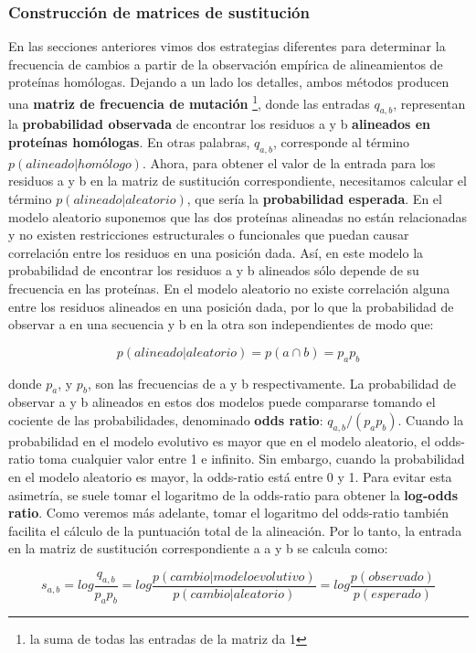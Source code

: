 \subsubsection{Construcción de matrices de sustitución}
En las secciones anteriores vimos dos estrategias diferentes para determinar la frecuencia de cambios a partir de la observación empírica de alineamientos de proteínas homólogas. Dejando a un lado los detalles, ambos métodos producen una \textbf{matriz de frecuencia de mutación} \footnote{la suma de todas las entradas de la matriz da 1}, donde las entradas $q_{a,b}$, representan la \textbf{probabilidad observada} de encontrar los residuos a y b \textbf{alineados en proteínas homólogas}. En otras palabras, $q_{a,b}$, corresponde al término $p(alineado|homólogo)$. Ahora, para obtener el valor de la entrada para los residuos a y b en la matriz de sustitución correspondiente, necesitamos calcular el término $p(alineado|aleatorio)$, que sería la \textbf{probabilidad esperada}. En el modelo aleatorio suponemos que las dos proteínas alineadas no están relacionadas y no existen restricciones estructurales o funcionales que puedan causar correlación entre los residuos en una posición dada. Así, en este modelo la probabilidad de encontrar los residuos a y b alineados sólo depende de su frecuencia en las proteínas. En el modelo aleatorio no existe correlación alguna entre los residuos alineados en una posición dada, por lo que la probabilidad de observar a en una secuencia y b en la otra son independientes de modo que:

$$p(alineado|aleatorio) = p(a \cap b) = p_a p_b $$

donde $p_a$, y $p_b$, son las frecuencias de a y b respectivamente. La probabilidad de observar a y b alineados en estos dos modelos puede compararse tomando el cociente de las probabilidades, denominado \textbf{odds ratio}: $q_{a,b}/(p_a p_b)$. Cuando la probabilidad en el modelo evolutivo es mayor que en el modelo aleatorio, el odds-ratio toma cualquier valor entre 1 e infinito. Sin embargo, cuando la probabilidad en el modelo aleatorio es mayor, la odds-ratio está entre 0 y 1. Para evitar esta asimetría, se suele tomar el logaritmo de la odds-ratio para obtener la \textbf{log-odds ratio}. Como veremos más adelante, tomar el logaritmo del odds-ratio también facilita el cálculo de la puntuación total de la alineación. Por lo tanto, la entrada en la matriz de sustitución correspondiente a a y b se calcula como:

$$ s_{a, b} = log \frac{q_{a, b}}{p_a p_b} = log \frac{p(cambio|modelo evolutivo)}{p(cambio|aleatorio)} = log \frac{p(observado)}{p(esperado)} $$

